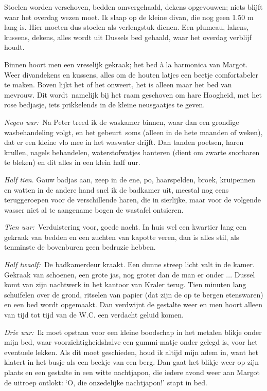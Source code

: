 \documentclass{book}
\begin{document}
Stoelen worden verschoven, bedden omvergehaald, dekens opgevouwen; niets blijft
waar het overdag wezen moet. Ik slaap op de kleine divan, die nog geen 1.50 m
lang is. Hier moeten dus stoelen als verlengstuk dienen. Een plumeau, lakens,
kussens, dekens, alles wordt uit Dussels bed gehaald, waar het overdag verblijf
houdt.

Binnen hoort men een vreselijk gekraak; het bed à la harmonica van Margot. Weer
divandekens en kussens, alles om de houten latjes een beetje comfortabeler te
maken. Boven lijkt het of het onweert, het is alleen maar het bed van mevrouw.
Dit wordt~namelijk bij het raam geschoven om hare Hoogheid, met het rose
bedjasje, iets prikkelends in de kleine neusgaatjes te geven.

\emph{Negen uur:}~Na Peter treed ik de waskamer binnen, waar dan een grondige
wasbehandeling volgt, en het gebeurt~soms (alleen in de hete maanden of weken),
dat er een kleine vlo mee in het waswater drijft. Dan tanden poetsen, haren
krullen, nagels behandelen, waterstofwatjes hanteren (dient om zwarte snorharen
te bleken) en dit alles in een klein half uur.

\emph{Half tien}. Gauw badjas aan, zeep in de ene, po, haarspelden, broek,
kruipennen en watten in de andere hand snel ik de badkamer uit, meestal nog eens
teruggeroepen voor de verschillende haren, die in sierlijke, maar voor de
volgende wasser niet al te aangename bogen de wastafel ontsieren.

\emph{Tien uur:}~Verduistering voor, goede nacht. In huis wel een kwartier lang
een gekraak van bedden en een zuchten van kapotte veren, dan is alles stil, als
tenminste de bovenburen geen bedruzie hebben.

\emph{Half twaalf:}~De badkamerdeur kraakt. Een dunne streep licht valt in de
kamer. Gekraak van schoenen, een grote jas, nog groter dan de man er onder ...
Dussel komt van zijn nachtwerk in het kantoor van Kraler terug. Tien minuten
lang schuifelen over de grond, ritselen van papier (dat zijn de op te bergen
etenswaren) en een bed wordt opgemaakt. Dan verdwijnt de gestalte weer en men
hoort alleen van tijd tot tijd van de W.C. een verdacht geluid komen.

\emph{Drie uur:}~Ik moet opstaan voor een kleine boodschap in het metalen blikje
onder mijn bed, waar voorzichtigheidshalve een gummi-matje onder gelegd is, voor
het eventuele lekken. Als dit moet geschieden, houd ik altijd mijn adem in, want
het klatert in het busje als een beekje van een berg. Dan gaat het blikje weer
op zijn plaats en een gestalte in een witte nachtjapon, die iedere avond weer
aan Margot de uitroep ontlokt: `O, die onzedelijke nachtjapon!' stapt in bed.
\end{document}
